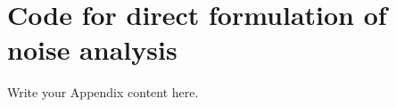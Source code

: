 
\chapter{Code for direct formulation of noise analysis} %

\label{codedirect} %


Write your Appendix content here.